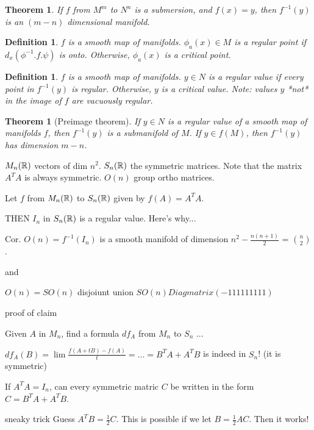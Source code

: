 \documentclass[11pt]{amsbook}
\theoremstyle{mystyle} \newtheorem{thrm}[thm]{Theorem}
\theoremstyle{mystyle} \newtheorem{defi}[thm]{Definition}
\theoremstyle{mystyle} \newtheorem{coro}[thm]{Corollary}
\theoremstyle{mystyle} \newtheorem{propo}[thm]{Proposition}
\theoremstyle{mystyle} \newtheorem{lemm}[thm]{Lemma}
\numberwithin{thm}{section}
\newcommand{\de}{\emph}
\begin{document}
\begin{thrm}
	If $f$ from $M^m$ to $N^n$ is a submersion, and $f(x) = y$, then $f^{-1}(y)$ is an $(m-n)$ dimensional manifold.
\end{thrm}

\begin{defi}
	$f$ is a smooth map of manifolds.
	$\phi_a(x) \in M$ is a \de{regular} point if $d_x(\phi^{-1}.f.\psi)$ is onto.  Otherwise, $\phi_a(x)$ is a \de{critical} point.
\end{defi}

\begin{defi}
	$f$ is a smooth map of manifolds.
	$y \in N$ is a \de{regular} value if every point in $f^{-1}(y)$ is regular.  Otherwise, $y$ is a \de{critical} value.  Note: values $y$ *not* in the image of $f$ are vacuously regular.
\end{defi}

\begin{thrm}[Preimage theorem]
	If $y \in N$ is a regular value of a smooth map of manifolds $f$, then $f^{-1}(y)$ is a submanifold of $M$.  If $y \in f(M)$, then $f^{-1}(y)$ has dimension $m-n$.
\end{thrm}

\begin{example}
	$M_n({\mathbb R})$ vectors of dim $n^2$.  $S_n({\mathbb R})$ the symmetric matrices.  Note that the matrix $A^T A$ is always symmetric.  $O(n)$ group ortho matrices.

	Let $f$ from $M_n({\mathbb R})$ to $S_n({\mathbb R})$ given by $f(A) = A^T A$.

	THEN $I_n$ in $S_n({\mathbb R})$ is a regular value.  Here's why...

	Cor. $O(n) = f^{-1}(I_n)$ is a smooth manifold of dimension $n^2 - \frac{n(n+1)}{2}$ = $\binom n2$.

	and

	$O(n) = SO(n)$ disjoiunt union $SO(n)Diagmatrix(-1 1 1 1 1 1 1 1 1)$

	proof of claim

	Given $A$ in $M_n$, find a formula $df_A$ from $M_n$ to $S_n$ ...

	$df_A(B) = \lim \frac{f(A+tB) - f(A)}{t} = \ldots = B^T A + A^T B$
	is indeed in $S_n$! (it is symmetric)

	If $A^T A = I_n$, can every symmetric matric $C$ be written in the form $C = B^T A + A^T B$.

	sneaky trick
	Guess $A^T B = \frac12 C$.
	This is possible if we let $B = \frac12 AC$.
	Then it works!
\end{example}
\end{document}
